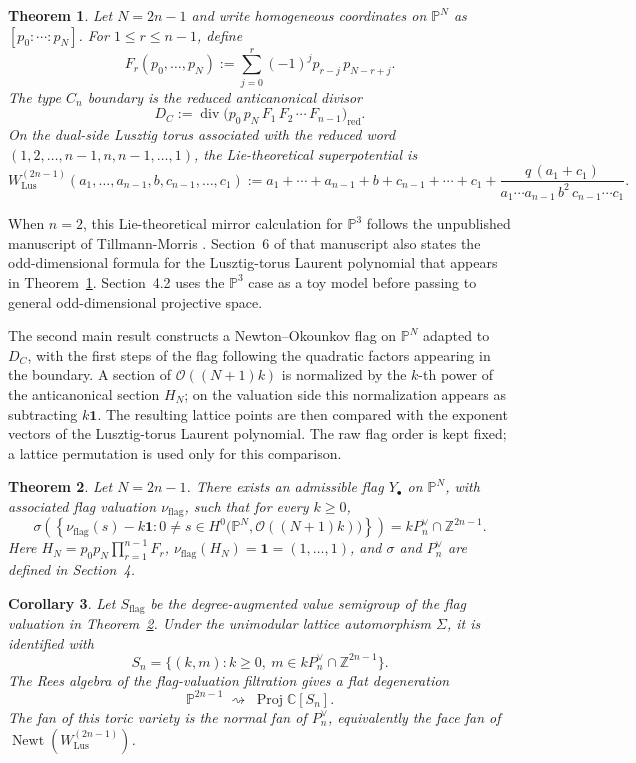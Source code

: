 \documentclass{article}
\newtheorem{thm}{Theorem}[section]
\newtheorem{cor}[thm]{Corollary}
\newcommand{\ZZ}{\mathbb{Z}}
\newcommand{\CC}{\mathbb{C}}
\newcommand{\PP}{\mathbb{P}}
\begin{document}
\begin{thm}\label{thm:intro-boundary-potential}
Let \(N=2n-1\) and write homogeneous coordinates on \(\PP^N\) as \([p_0:\cdots:p_N]\).
For \(1\le r\le n-1\), define
\[
F_r(p_0,\dots,p_N):=\sum_{j=0}^r(-1)^j p_{r-j}\,p_{N-r+j}.
\]
The type \(C_n\) boundary is the reduced anticanonical divisor
\[
D_C
:=\operatorname{div}\bigl(p_0\,p_N\,F_1\,F_2\,\cdots\,F_{n-1}\bigr)_{\mathrm{red}} .
\]
On the dual-side Lusztig torus associated with the reduced word \((1,2,\dots,n-1,n,n-1,\dots,1)\), the Lie-theoretical superpotential is
\[
W_{\mathrm{Lus}}^{(2n-1)}(a_1,\dots,a_{n-1},b,c_{n-1},\dots,c_1)
:=
a_1+\cdots+a_{n-1}+b+c_{n-1}+\cdots+c_1
+
\frac{q\,(a_1+c_1)}{a_1\cdots a_{n-1}\,b^2\,c_{n-1}\cdots c_1}.
\]
\end{thm}

When \(n=2\), this Lie-theoretical mirror calculation for \(\PP^3\) follows the unpublished manuscript of Tillmann-Morris \cite{TillmannMorris}. Section~6 of that manuscript also states the odd-dimensional formula for the Lusztig-torus Laurent polynomial that appears in Theorem~\ref{thm:intro-boundary-potential}. Section~4.2 uses the \(\PP^3\) case as a toy model before passing to general odd-dimensional projective space.

The second main result constructs a Newton--Okounkov flag on \(\PP^N\) adapted to \(D_C\), with the first steps of the flag following the quadratic factors appearing in the boundary. A section of \(\mathcal O((N+1)k)\) is normalized by the \(k\)-th power of the anticanonical section \(H_N\); on the valuation side this normalization appears as subtracting \(k\mathbf 1\). The resulting lattice points are then compared with the exponent vectors of the Lusztig-torus Laurent polynomial. The raw flag order is kept fixed; a lattice permutation is used only for this comparison.

\begin{thm}\label{thm:intro-no-body}
Let \(N=2n-1\). There exists an admissible flag \(Y_\bullet\) on \(\PP^N\), with associated flag valuation \(\nu_{\mathrm{flag}}\), such that for every \(k\ge0\),
\[
\sigma\left(
\left\{
\nu_{\mathrm{flag}}(s)-k\mathbf 1:
0\ne s\in H^0\bigl(\PP^N,\mathcal O((N+1)k)\bigr)
\right\}
\right)
=
kP_n^\vee\cap\ZZ^{2n-1}.
\]
Here \(H_N=p_0p_N\prod_{r=1}^{n-1}F_r\), \(\nu_{\mathrm{flag}}(H_N)=\mathbf 1=(1,\ldots,1)\), and \(\sigma\) and \(P_n^\vee\) are defined in Section~4.
\end{thm}

\begin{cor}\label{cor:intro-toric-degen}
Let \(S_{\mathrm{flag}}\) be the degree-augmented value semigroup of the flag valuation in Theorem~\ref{thm:intro-no-body}. Under the unimodular lattice automorphism \(\Sigma\), it is identified with
\[
S_n=\{(k,m):k\ge0,\ m\in kP_n^\vee\cap\ZZ^{2n-1}\}.
\]
The Rees algebra of the flag-valuation filtration gives a flat degeneration
\[
\PP^{2n-1}\;\rightsquigarrow\; \operatorname{Proj}\CC[S_n].
\]
The fan of this toric variety is the normal fan of \(P_n^\vee\), equivalently the face fan of \(\operatorname{Newt}(W_{\mathrm{Lus}}^{(2n-1)})\).
\end{cor}
\end{document}
